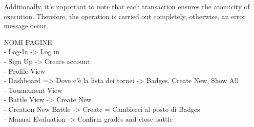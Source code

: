 Additionally, it's important to note that each transaction ensures the atomicity of execution. 
Therefore, the operation is carried out completely, otherwise, an error message occur.

{\color{red} 
    NOMI PAGINE:\\
    - Log-In -> Log in\\
    - Sign Up -> Creare account\\
    - Profile View \\
    - Dashboard => Dove c'è la lista dei tornei -> Badges, Create New, Show All\\ 
    - Tournament View \\
    - Battle View -> Create New\\
    - Creation New Battle -> Create = Cambierei al posto di Badges\\
    - Manual Evaluation -> Confirm grades and close battle \\
}


